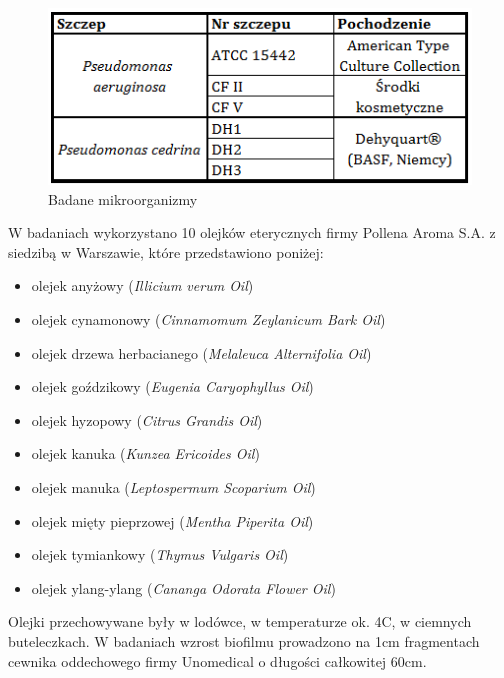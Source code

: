 \documentclass[11pt,a4paper]{report}
\begin{document}
\begin{figure}[!h]
\caption{Badane mikroorganizmy}\label{szczepy}
\begin{center}
\includegraphics[scale=1]{img/mgr_szczepy_popr.png}
\end{center} 
\end{figure}
\clearpage

W badaniach wykorzystano 10 olejków eterycznych  firmy Pollena Aroma S.A. z siedzibą w Warszawie, które przedstawiono poniżej:
\begin{itemize}
\item olejek anyżowy (\textit{Illicium verum Oil})
\item olejek cynamonowy (\textit{Cinnamomum Zeylanicum Bark Oil})
\item olejek drzewa herbacianego (\textit{Melaleuca Alternifolia Oil})
\item olejek goździkowy (\textit{Eugenia Caryophyllus Oil})
\item olejek hyzopowy (\textit{Citrus Grandis Oil})
\item olejek kanuka (\textit{Kunzea Ericoides Oil})
\item olejek manuka (\textit{Leptospermum Scoparium Oil})
\item olejek mięty pieprzowej (\textit{Mentha Piperita Oil})
\item olejek tymiankowy (\textit{Thymus Vulgaris Oil})
\item olejek ylang-ylang (\textit{Cananga Odorata Flower Oil})\\
\end{itemize}
Olejki przechowywane były w lodówce, w temperaturze ok. 4\degree C, w ciemnych buteleczkach.
\clearpage
W badaniach wzrost biofilmu prowadzono na 1cm fragmentach cewnika oddechowego firmy Unomedical o długości całkowitej 60cm. \
\end{document}

